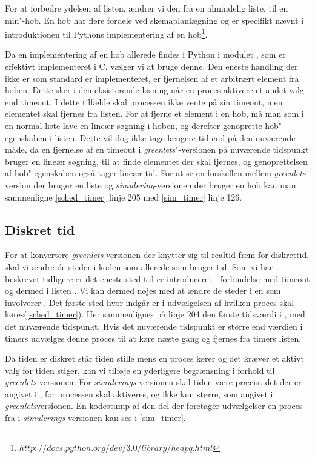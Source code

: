 For at forbedre ydelsen af  listen, 
ændrer vi den fra en almindelig liste, til en min"-hob. En hob har
flere fordele ved skemaplanlægning og er specifikt nævnt i introduktionen til Pythons implementering af en hob\footnote{$http://docs.python.org/dev/3.0/library/heapq.html$}. 

Da en implementering af en hob
allerede findes i Python i modulet , som er effektivt implementeret i C, vælger vi at bruge denne. Den eneste handling
der ikke er som standard er implementeret, er fjernelsen af et arbitrært element
fra hoben. Dette sker i den eksisterende løsning når en proces
aktivere et andet valg i  end timeout. I dette tilfælde skal
processen ikke vente på sin timeout, men elementet skal fjernes fra
 listen. For at fjerne et element i en hob, må man som i
en normal liste lave en lineær søgning i hoben, og derefter genoprette
hob"-egenskaben i listen. Dette vil dog ikke tage længere tid end på den nuværende måde, da en fjernelse af en timeout i \emph{greenlets}"-versionen på nuværende
tidspunkt bruger en lineær søgning, til at finde elementet der skal
fjernes, og genoprettelsen af hob"-egenskaben også tager lineær tid. For at se en forskellen mellem \emph{greenlets}-version der bruger en liste og \emph{simulering}-versionen der bruger en hob kan man sammenligne \cref{sched_timer} linje 205 med \cref{sim_timer} linje 126. 

\subsection{Diskret tid} 
For at konvertere \emph{greenlets}-versionen der knytter sig til realtid frem for diskrettid, skal vi ændre de steder i koden som allerede som bruger tid. Som vi har beskrevet tidligere er det eneste sted tid er introduceret i forbindelse med timeout og dermed i listen . Vi kan dermed nøjes med at ændre de steder i \sched en som involverer . Det første sted hvor  indgår er i udvælgelsen af hvilken proces skal køres(\cref{sched_timer}). Her sammenlignes på linje 204  den første tidsværdi i , med det nuværende tidspunkt. Hvis det nuværende tidspunkt er større end værdien i timers udvælges denne proces til at køre næste gang og fjernes fra timers listen.

Da tiden er diskret står tiden stille mens en proces kører og det kræver et aktivt valg før tiden stiger, kan vi tilføje en yderligere begrænsning i forhold til \emph{greenlets}-versionen. For \emph{simulerings}-versionen skal tiden være præcist det der er angivet i , før processen skal aktiveres, og ikke kun større, som angivet i \emph{greenlets}versionen. En kodestump af den del der foretager udvælgelser en proces fra  i \emph{simulerings}-versionen  kan ses i \cref{sim_timer}. 

